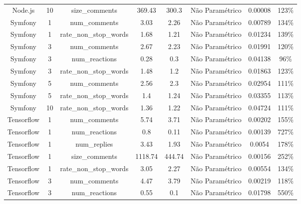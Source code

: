\documentclass[12pt,openany,oneside,a4paper,english,brazil]{abntbibufjf}
\begin{document}
\begin{table}[htbp]
{\begin{tabular}{|c|c|c|c|c|c|c|c|}
Node.js    & 10 & size\_comments         & 369.43             & 300.3                  & Não Paramétrico & 0.00008 & 123\%     \\
Symfony    & 1  & num\_comments          & 3.03               & 2.26                   & Não Paramétrico & 0.00789 & 134\%     \\
Symfony    & 1  & rate\_non\_stop\_words & 1.68               & 1.21                   & Não Paramétrico & 0.01234 & 139\%     \\
Symfony    & 3  & num\_comments          & 2.67               & 2.23                   & Não Paramétrico & 0.01991 & 120\%     \\
Symfony    & 3  & num\_reactions         & 0.28               & 0.3                    & Não Paramétrico & 0.04138 & 96\%      \\
Symfony    & 3  & rate\_non\_stop\_words & 1.48               & 1.2                    & Não Paramétrico & 0.01863 & 123\%     \\
Symfony    & 5  & num\_comments          & 2.56               & 2.3                    & Não Paramétrico & 0.02954 & 111\%     \\
Symfony    & 5  & rate\_non\_stop\_words & 1.4                & 1.24                   & Não Paramétrico & 0.03355 & 113\%     \\
Symfony    & 10 & rate\_non\_stop\_words & 1.36               & 1.22                   & Não Paramétrico & 0.04724 & 111\%     \\
Tensorflow & 1  & num\_comments          & 5.74               & 3.71                   & Não Paramétrico & 0.00202 & 155\%     \\
Tensorflow & 1  & num\_reactions         & 0.8                & 0.11                   & Não Paramétrico & 0.00139 & 727\%     \\
Tensorflow & 1  & num\_replies           & 3.43               & 1.93                   & Não Paramétrico & 0.0054  & 178\%     \\
Tensorflow & 1  & size\_comments         & 1118.74            & 444.74                 & Não Paramétrico & 0.00156 & 252\%     \\
Tensorflow & 1  & rate\_non\_stop\_words & 3.05               & 2.27                   & Não Paramétrico & 0.00554 & 134\%     \\
Tensorflow & 3  & num\_comments          & 4.47               & 3.79                   & Não Paramétrico & 0.00219 & 118\%     \\
Tensorflow & 3  & num\_reactions         & 0.55               & 0.1                    & Não Paramétrico & 0.01798 & 550\%     \\

\end{tabular}}
\end{table}
\end{document}
